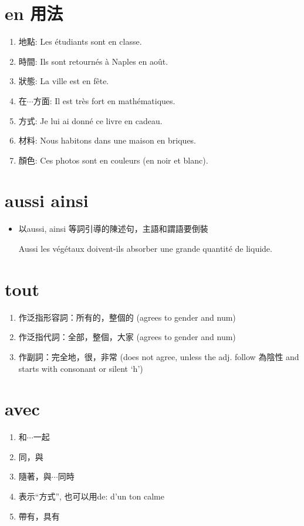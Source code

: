 \documentclass{book}
\begin{document}
    \section{en 用法}
        \begin{enumerate}
            \item 地點: Les étudiants sont en classe.
            \item 時間: Ils sont retournés à Naples en août.
            \item 狀態: La ville est en fête. 
            \item 在$\cdots$方面: Il est très fort en mathématiques.
            \item 方式: Je lui ai donné ce livre en cadeau.
            \item 材料: Nous habitons dans une maison en briques.
            \item 顏色: Ces photos sont en couleurs (en noir et blanc).
        \end{enumerate}
    \section{aussi ainsi}
        \begin{itemize}
            \item 以aussi, ainsi 等詞引導的陳述句，主語和謂語要倒裝
                \begin{center}
                    Aussi les végétaux doivent-ils absorber une grande quantité de liquide.
                \end{center}
        \end{itemize}
        
    \section{tout}
        \begin{enumerate}
            \item 作泛指形容詞：所有的，整個的 (agrees to gender and num)
            \item 作泛指代詞：全部，整個，大家 (agrees to gender and num)
            \item 作副詞：完全地，很，非常 (does not agree, unless the adj. follow 為陰性 and starts with consonant or silent `h')
        \end{enumerate}
    
    \section{avec}
        \begin{enumerate}
            \item 和$\cdots$一起
            \item 同，與
            \item 隨著，與$\cdots$同時
            \item 表示``方式'', 也可以用de: d'un ton calme
            \item 帶有，具有
        \end{enumerate}
\end{document}
